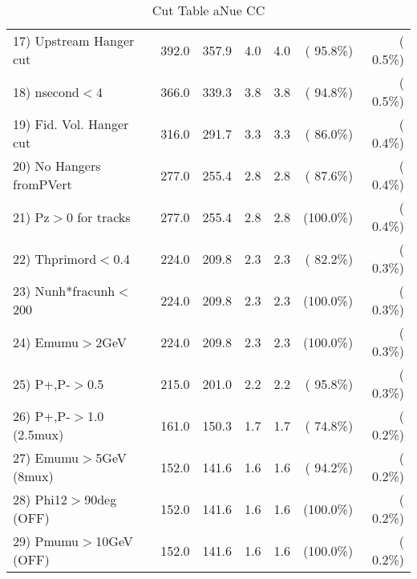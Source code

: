 \begin{table}[h!]
\begin{tabular}{||l||r|r|r|r|r|r||}
 17) Upstream Hanger cut  &        392.0 &        357.9 &          4.0 &          4.0 & ( 95.8\%) & (  0.5\%) \\
 18) nsecond$<$4          &        366.0 &        339.3 &          3.8 &          3.8 & ( 94.8\%) & (  0.5\%) \\
 19) Fid. Vol. Hanger cut &        316.0 &        291.7 &          3.3 &          3.3 & ( 86.0\%) & (  0.4\%) \\
 20) No Hangers fromPVert &        277.0 &        255.4 &          2.8 &          2.8 & ( 87.6\%) & (  0.4\%) \\
 21) Pz$>$0 for tracks    &        277.0 &        255.4 &          2.8 &          2.8 & (100.0\%) & (  0.4\%) \\
 22) Thprimord$<$0.4      &        224.0 &        209.8 &          2.3 &          2.3 & ( 82.2\%) & (  0.3\%) \\
 23) Nunh*fracunh$<$200   &        224.0 &        209.8 &          2.3 &          2.3 & (100.0\%) & (  0.3\%) \\
 24) Emumu$>$2GeV         &        224.0 &        209.8 &          2.3 &          2.3 & (100.0\%) & (  0.3\%) \\
 25) P+,P-$>$0.5          &        215.0 &        201.0 &          2.2 &          2.2 & ( 95.8\%) & (  0.3\%) \\
 26) P+,P-$>$1.0 (2.5mux) &        161.0 &        150.3 &          1.7 &          1.7 & ( 74.8\%) & (  0.2\%) \\
 27) Emumu$>$5GeV  (8mux) &        152.0 &        141.6 &          1.6 &          1.6 & ( 94.2\%) & (  0.2\%) \\
 28) Phi12$>$90deg  (OFF) &        152.0 &        141.6 &          1.6 &          1.6 & (100.0\%) & (  0.2\%) \\
 29) Pmumu$>$10GeV  (OFF) &        152.0 &        141.6 &          1.6 &          1.6 & (100.0\%) & (  0.2\%) \\
 \hline
 \hline
 \end{tabular}
 \caption{Cut Table  aNue CC  }
 \label{tab-cutcohjpsi-mumu_anuecc}
 \end{table}
